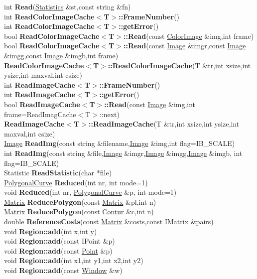 \documentclass[10pt,titlepage]{article}
\def\functionlistentry#1#2#3#4#5#6{\noindent #1 {\bf #2}(#3) \dotfill #6\\}
\def\letterref#1{}
\def\letterlabelend#1{}
\begin{document}
{{\letterref{Ra}
\letterref{Re}
\letterref{Rg}
\letterref{Ri}
\letterref{Ro}
\letterlabelend{Re}
\functionlistentry{int}{Read}{\hyperlink{Statistics}{Statistics} \&st,const string \&fn}{873}{statistics}{}
\functionlistentry{int}{ReadColorImageCache$<$T$>$::FrameNumber}{}{137}{imageio}{}
\functionlistentry{int}{ReadColorImageCache$<$T$>$::getError}{}{139}{imageio}{}
\functionlistentry{bool}{ReadColorImageCache$<$T$>$::Read}{const \hyperlink{ColorImage}{ColorImage} \&img,int frame}{134}{imageio}{}
\functionlistentry{bool}{ReadColorImageCache$<$T$>$::Read}{const \hyperlink{Image}{Image} \&imgr,const \hyperlink{Image}{Image} \&imgg,const \hyperlink{Image}{Image} \&imgb,int frame}{135}{imageio}{}
\functionlistentry{}{ReadColorImageCache$<$T$>$::ReadColorImageCache}{T \&tr,int xsize,int ysize,int maxval,int csize}{132}{imageio}{}
\functionlistentry{int}{ReadImageCache$<$T$>$::FrameNumber}{}{136}{imageio}{}
\functionlistentry{int}{ReadImageCache$<$T$>$::getError}{}{138}{imageio}{}
\functionlistentry{bool}{ReadImageCache$<$T$>$::Read}{const \hyperlink{Image}{Image} \&img,int frame=ReadImagCache$<$T$>$::next}{133}{imageio}{}
\functionlistentry{}{ReadImageCache$<$T$>$::ReadImageCache}{T \&tr,int xsize,int ysize,int maxval,int csize}{131}{imageio}{}
\functionlistentry{\hyperlink{Image}{Image}}{ReadImg}{const string \&filename,\hyperlink{Image}{Image} \&img,int flag=IB\_SCALE}{113}{imageio}{}
\functionlistentry{int}{ReadImg}{const string \&file,\hyperlink{Image}{Image} \&imgr,\hyperlink{Image}{Image} \&imgg,\hyperlink{Image}{Image} \&imgb, int flag=IB\_SCALE}{115}{imageio}{}
\functionlistentry{Statistic}{ReadStatistic}{char *file}{1602}{obsolet}{}
\functionlistentry{\hyperlink{PolygonalCurve}{PolygonalCurve}}{Reduced}{int nr, int mode=1}{607}{geoObject}{}
\functionlistentry{void}{Reduced}{int nr, \hyperlink{PolygonalCurve}{PolygonalCurve} \&p, int mode=1}{608}{geoObject}{}
\functionlistentry{\hyperlink{Matrix}{Matrix}}{ReducePolygon}{const \hyperlink{Matrix}{Matrix} \&pl,int n}{281}{datastructures}{}
\functionlistentry{\hyperlink{Matrix}{Matrix}}{ReducePolygon}{const \hyperlink{Contur}{Contur} \&c,int n}{282}{datastructures}{}
\functionlistentry{double}{ReferenceCosts}{const \hyperlink{Matrix}{Matrix} \&costs,const IMatrix \&pairs}{1262}{registration}{}
\functionlistentry{void}{Region::add}{int x,int y}{477}{conturs}{}
\functionlistentry{void}{Region::add}{const IPoint \&p}{478}{conturs}{}
\functionlistentry{void}{Region::add}{const \hyperlink{Point}{Point} \&p}{479}{conturs}{}
\functionlistentry{void}{Region::add}{int x1,int y1,int x2,int y2}{480}{conturs}{}
\functionlistentry{void}{Region::add}{const \hyperlink{Window}{Window} \&w}{481}{conturs}{}
}}
\end{document}
